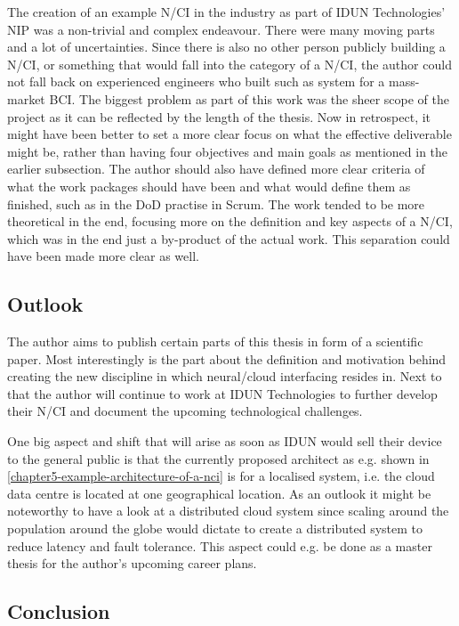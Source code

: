 The creation of an example N/CI in the industry as part of IDUN Technologies' NIP was a non-trivial and complex endeavour. There were many moving parts and a lot of uncertainties. Since there is also no other person publicly building a N/CI, or something that would fall into the category of a N/CI, the author could not fall back on experienced engineers who built such as system for a mass-market BCI. The biggest problem as part of this work was the sheer scope of the project as it can be reflected by the length of the thesis. Now in retrospect, it might have been better to set a more clear focus on what the effective deliverable might be, rather than having four objectives and main goals as mentioned in the earlier subsection. The author should also have defined more clear criteria of what the work packages should have been and what would define them as finished, such as in the DoD practise in Scrum. The work tended to be more theoretical in the end, focusing more on the definition and key aspects of a N/CI, which was in the end just a by-product of the actual work. This separation could have been made more clear as well.

\subsection{Outlook}
\label{chapter5-outlook}

The author aims to publish certain parts of this thesis in form of a scientific paper. Most interestingly is the part about the definition and motivation behind creating the new discipline in which neural/cloud interfacing resides in. Next to that the author will continue to work at IDUN Technologies to further develop their N/CI and document the upcoming technological challenges.

One big aspect and shift that will arise as soon as IDUN would sell their device to the general public is that the currently proposed architect as e.g. shown in \autoref{chapter5-example-architecture-of-a-nci} is for a localised system, i.e. the cloud data centre is located at one geographical location. As an outlook it might be noteworthy to have a look at a distributed cloud system since scaling around the population around the globe would dictate to create a distributed system to reduce latency and fault tolerance. This aspect could e.g. be done as a master thesis for the author's upcoming career plans.

\subsection{Conclusion}
\label{chapter5-conclusion}

